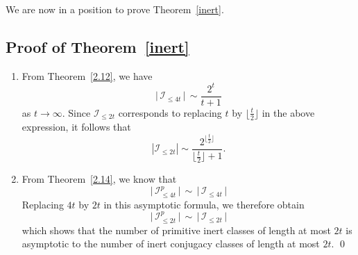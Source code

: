 \documentclass[a4paper,12pt]{amsart}
\numberwithin{equation}{section}
\theoremstyle{definition}
\newcommand{\thmref}[1]{Theorem~\ref{#1}}
\numberwithin{equation}{section}
\begin{document}
\medskip    We are now in a position to prove \thmref{inert}. 
\subsection{Proof of \thmref{inert}}
\begin{enumerate}
    \item From \thmref{2.12}, we have
\[
\lvert\,\mathscr{I}_{\leq4t}\,\rvert\, \sim \frac{2^{t}}{t+1}
\]
as $t \to \infty$. Since $\mathscr{I}_{\leq 2t}$ corresponds to replacing $t$ by $\lfloor \frac{t}{2} \rfloor$ in the above expression, it follows that 
\[
|\mathscr{I}_{\leq2t}| \sim \frac{2^{\lfloor \frac{t}{2} \rfloor}}{\lfloor \frac{t}{2} \rfloor +1}.
\] 
\item From \thmref{2.14}, we know that 
\[ 
\lvert\,\mathscr{I}^p_{\leq4t}\,\rvert\, \sim \,\lvert\,\mathscr{I}_{\leq4t}\,\rvert
\]
Replacing $4t$ by $2t$ in this asymptotic formula, we therefore obtain
\[
\lvert\,\mathscr{I}^p_{\leq2t}\,\rvert\, \sim \,\lvert\,\mathscr{I}_{\leq2t}\,\rvert
\]
which shows that the number of primitive inert classes of length at most $2t$ is asymptotic to the number of inert conjugacy classes of length at most $2t$. \qed
\end{enumerate}
\end{document}
